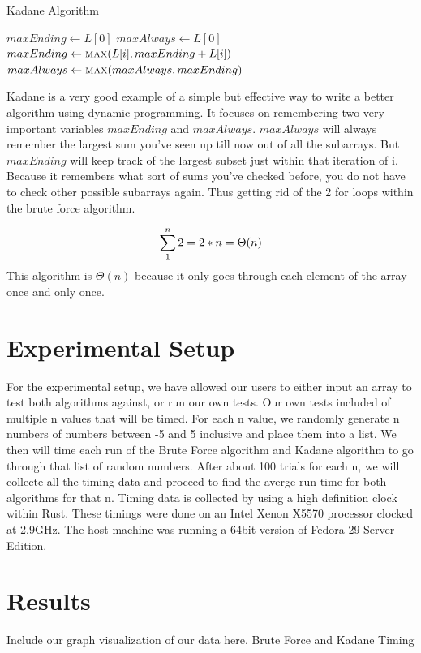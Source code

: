 \documentclass[10pt, letterpaper]{article}
\begin{document}
  \begin{algorithm}
		\caption{Kadane Algorithm}\label{kadane}
	\begin{algorithmic}
    \State $maxEnding \gets L[0]$
    \State $maxAlways \gets L[0]$
    \State $maxEnding \gets \Call{max}{L[i], maxEnding + L[i]}$
    \State $maxAlways \gets \Call{max}{maxAlways, maxEnding}$
    \EndFor
	  \EndFunction
	\end{algorithmic}
	\end{algorithm}
  Kadane is a very good example of a simple but effective way to write a better algorithm using dynamic programming. It focuses on remembering two very important variables $maxEnding$ and $maxAlways$. $maxAlways$ will always remember the largest sum you've seen up till now out of all the subarrays. But $maxEnding$ will keep track of the largest subset just within that iteration of i. Because it remembers what sort of sums you've checked before, you do not have to check other possible subarrays again. Thus getting rid of the 2 for loops within the brute force algorithm.

  \[
  \sum_1^n2 \\
  = 2 * n \\
  = \Theta(n)
		\]
	This algorithm is $\Theta(n)$ because it only goes through each element of the array once and only once.
	\section{Experimental Setup}
	For the experimental setup, we have allowed our users to either input an array to test both algorithms against, or run our own tests.
  Our own tests included of multiple n values that will be timed. For each n value, we randomly generate n numbers of numbers between -5 and 5 inclusive and place them into a list. We then will time each run of the Brute Force algorithm and Kadane algorithm to go through that list of random numbers. After about 100 trials for each n, we will collecte all the timing data and proceed to find the averge run time for both algorithms for that n.
  Timing data is collected by using a high definition clock within Rust. These timings were done on an Intel Xenon X5570 processor clocked at 2.9GHz. The host machine was running a 64bit version of Fedora 29 Server Edition.
	\section{Results}
	Include our graph visualization of our data here. Brute Force and Kadane Timing
\end{document}
